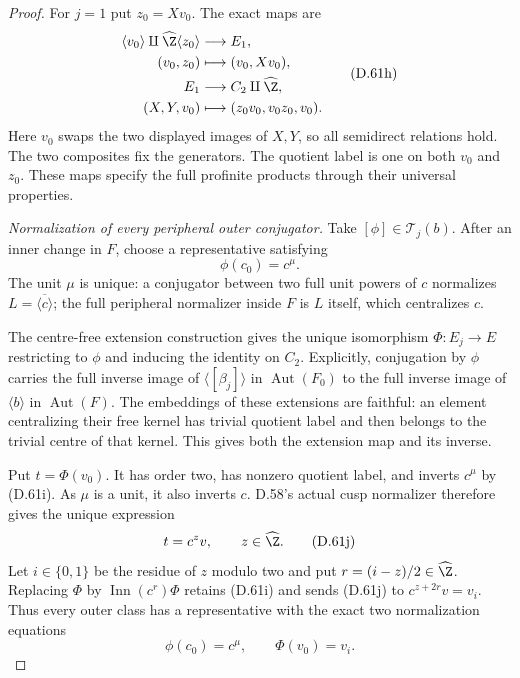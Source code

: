 \begin{proof}
For $j=1$ put $z_0=Xv_0$. The exact maps are
\[
 \begin{aligned}
 \langle v_0\rangle\amalg\widehat\Z\langle z_0\rangle
       &\longrightarrow E_1,\\
 (v_0,z_0)&\longmapsto(v_0,Xv_0),\\
 E_1&\longrightarrow C_2\amalg\widehat\Z,\\
 (X,Y,v_0)&\longmapsto(z_0v_0,v_0z_0,v_0).
 \end{aligned}                                             \tag{D.61h}
\]
Here $v_0$ swaps the two displayed images of
$X,Y$, so all semidirect relations hold.
The two composites fix the generators.
The quotient label is one on both $v_0$ and
$z_0$. These maps specify the full profinite
products through their universal properties.

\emph{Normalization of every peripheral outer conjugator.}
Take $[\phi]\in\mathcal T_j(b)$.
After an inner change in $F$, choose a
representative satisfying
\[
                         \phi(c_0)=c^\mu .              \tag{D.61i}
\]
The unit $\mu$ is unique: a conjugator between
two full unit powers of $c$ normalizes
$L=\overline{\langle c\rangle}$; the full
peripheral normalizer inside $F$ is $L$ itself,
which centralizes $c$.

The centre-free extension construction gives
the unique isomorphism
$\Phi:E_j\to E$ restricting to $\phi$ and
inducing the identity on $C_2$.
Explicitly, conjugation by $\phi$ carries
the full inverse image of
$\langle[\beta_j]\rangle$ in
$\operatorname{Aut}(F_0)$ to the full inverse
image of $\langle b\rangle$ in
$\operatorname{Aut}(F)$.
The embeddings of these extensions are faithful:
an element centralizing their free kernel has
trivial quotient label and then belongs to
the trivial centre of that kernel.
This gives both the extension map and its
inverse.

Put $t=\Phi(v_0)$. It has order two,
has nonzero quotient label, and inverts
$c^\mu$ by (D.61i).
As $\mu$ is a unit, it also inverts $c$.
D.58's actual cusp normalizer therefore gives
the unique expression
\[
                           t=c^zv,\qquad z\in\widehat\Z.
                                                               \tag{D.61j}
\]
Let $i\in\{0,1\}$ be the residue of $z$ modulo
two and put $r=(i-z)/2\in\widehat\Z$.
Replacing $\Phi$ by $\operatorname{Inn}(c^r)\Phi$
retains (D.61i) and sends (D.61j) to
$c^{z+2r}v=v_i$.
Thus every outer class has a representative
with the exact two normalization equations
\[
                    \phi(c_0)=c^\mu,\qquad
                              \Phi(v_0)=v_i.            \tag{D.61k}
\]


\end{proof}
